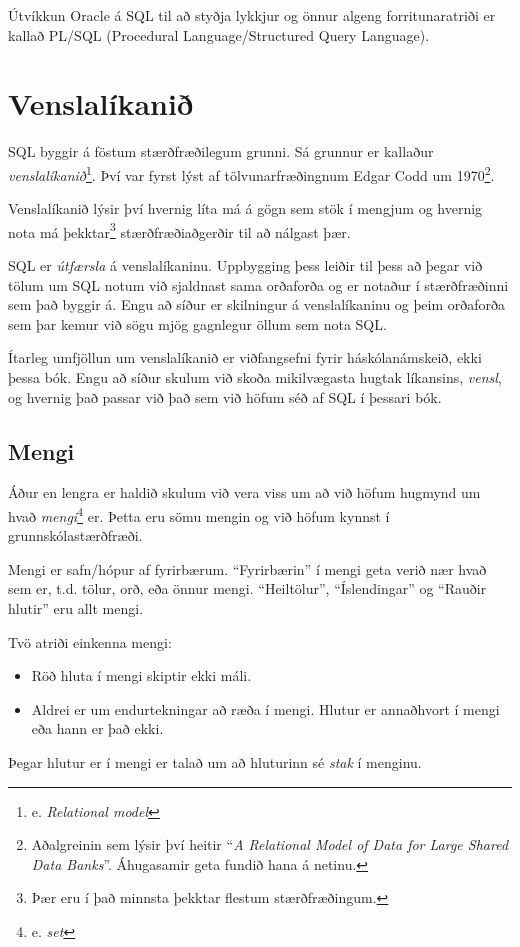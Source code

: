 Útvíkkun Oracle á SQL til að styðja lykkjur og önnur algeng forritunaratriði er kallað PL/SQL (Procedural Language/Structured Query Language).
\section{Venslalíkanið}
SQL byggir á föstum stærðfræðilegum grunni. Sá grunnur er kallaður \emph{venslalíkanið}\footnote{e. \emph{Relational model}}. Því var fyrst lýst af tölvunarfræðingnum Edgar Codd um 1970\footnote{Aðalgreinin sem lýsir því heitir ``\emph{A Relational Model of Data for Large Shared Data Banks}''. Áhugasamir geta fundið hana á netinu.}.

Venslalíkanið lýsir því hvernig líta má á gögn sem stök í mengjum og hvernig nota má þekktar\footnote{Þær eru í það minnsta þekktar flestum stærðfræðingum.} stærðfræðiaðgerðir til að nálgast þær. 

SQL er \emph{útfærsla} á venslalíkaninu. Uppbygging þess leiðir til þess að þegar við tölum um SQL notum við sjaldnast sama orðaforða og er notaður í stærðfræðinni sem það byggir á. Engu að síður er skilningur á venslalíkaninu og þeim orðaforða sem þar kemur við sögu mjög gagnlegur öllum sem nota SQL.

Ítarleg umfjöllun um venslalíkanið er viðfangsefni fyrir háskólanámskeið, ekki þessa bók. Engu að síður skulum við skoða mikilvægasta hugtak líkansins, \emph{vensl}, og hvernig það passar við það sem við höfum séð af SQL í þessari bók.
\subsection{Mengi}
Áður en lengra er haldið skulum við vera viss um að við höfum hugmynd um hvað \emph{mengi}\footnote{e. \emph{set}} er. Þetta eru sömu mengin og við höfum kynnst í grunnskólastærðfræði.

Mengi er safn/hópur af fyrirbærum. ``Fyrirbærin'' í mengi geta verið nær hvað sem er, t.d. tölur, orð, eða önnur mengi. ``Heiltölur'', ``Íslendingar'' og ``Rauðir hlutir'' eru allt mengi.

Tvö atriði einkenna mengi:
\begin{itemize}
 \item Röð hluta í mengi skiptir ekki máli.
 \item Aldrei er um endurtekningar að ræða í mengi. Hlutur er annaðhvort í mengi eða hann er það ekki.
\end{itemize}
Þegar hlutur er í mengi er talað um að hluturinn sé \emph{stak} í menginu.

